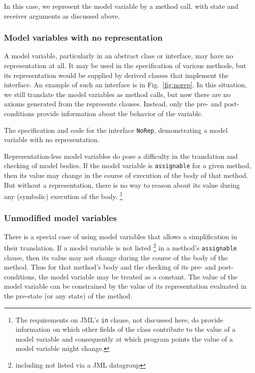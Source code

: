 \documentclass{sig-alternate}
\begin{document}
In this case, we represent the model variable by a method call, with state and receiver arguments
as discussed above.

\subsubsection{Model variables with no representation}

A model variable, particularly in an abstract class or interface, may have no representation
at all.  It may be used in the specification of various methods, but its representation would be
supplied by derived classes that implement the interface.  An example of such an interface is
in Fig.~\ref{fig:norep}.  In this situation, we still translate the model variables as method calls,
but now there are no axioms generated from the represents clauses.  Instead, only the
pre- and post-conditions provide information about the behavior of the variable.

\begin{BFIGURE}

\caption{The specification and code for the interface \texttt{NoRep},
demonstrating a model variable with no representation.}
\label{fig:norep}
\end{BFIGURE}

Representation-less model variables do pose a difficulty in the translation and checking of model bodies.  If the model variable is \texttt{assignable} for a given method, then its value may 
change in the course of execution of the body of that method.  But without a representation,
there is no way to reason about its value during any (symbolic) execution of the body.
\footnote{The requirements on JML's  \texttt{in} clause, not discussed here, do provide information
on which other fields of the class contribute to the value of a model variable and consequently
at which program points the value of a model variable might change.}

\subsubsection{Unmodified model variables}

There is a special case of using model variables that allows a simplification in their translation.
If a model variable is not listed \footnote{including not listed via a JML datagroup} in a
method's \texttt{assignable} clause, then its value may not change during the course of the
body of the method.  Thus for that method's body and the checking of its pre- and
post-conditions, the model variable may be treated as a constant.  The value of the model 
variable can be constrained by the value of its representation evaluated in the pre-state
(or any state) of the method.
\end{document}

